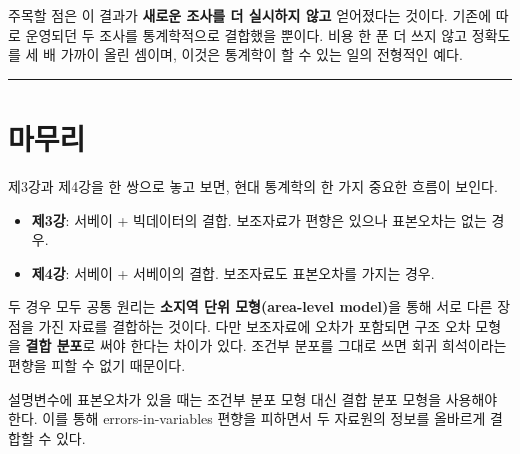 \documentclass[
  letterpaper,
  DIV=11,
  numbers=noendperiod]{scrreprt}
\providecommand{\tightlist}{%
  \setlength{\itemsep}{0pt}\setlength{\parskip}{0pt}}
\begin{document}
주목할 점은 이 결과가 \textbf{새로운 조사를 더 실시하지 않고} 얻어졌다는
것이다. 기존에 따로 운영되던 두 조사를 통계학적으로 결합했을 뿐이다.
비용 한 푼 더 쓰지 않고 정확도를 세 배 가까이 올린 셈이며, 이것은
통계학이 할 수 있는 일의 전형적인 예다.

\begin{center}\rule{0.5\linewidth}{0.5pt}\end{center}

\section{마무리}\label{uxb9c8uxbb34uxb9ac-2}

제3강과 제4강을 한 쌍으로 놓고 보면, 현대 통계학의 한 가지 중요한 흐름이
보인다.

\begin{itemize}
\tightlist
\item
  \textbf{제3강}: 서베이 + 빅데이터의 결합. 보조자료가 편향은 있으나
  표본오차는 없는 경우.
\item
  \textbf{제4강}: 서베이 + 서베이의 결합. 보조자료도 표본오차를 가지는
  경우.
\end{itemize}

두 경우 모두 공통 원리는 \textbf{소지역 단위 모형(area-level model)}을
통해 서로 다른 장점을 가진 자료를 결합하는 것이다. 다만 보조자료에
오차가 포함되면 구조 오차 모형을 \textbf{결합 분포}로 써야 한다는 차이가
있다. 조건부 분포를 그대로 쓰면 회귀 희석이라는 편향을 피할 수 없기
때문이다.

\begin{tcolorbox}[enhanced jigsaw, arc=.35mm, bottomrule=.15mm, bottomtitle=1mm, breakable, colback=white, colbacktitle=quarto-callout-important-color!10!white, colframe=quarto-callout-important-color-frame, coltitle=black, left=2mm, leftrule=.75mm, opacityback=0, opacitybacktitle=0.6, rightrule=.15mm, title=\textcolor{quarto-callout-important-color}{\faExclamation}\hspace{0.5em}{결론}, titlerule=0mm, toprule=.15mm, toptitle=1mm]

설명변수에 표본오차가 있을 때는 조건부 분포 모형 대신 결합 분포 모형을
사용해야 한다. 이를 통해 errors-in-variables 편향을 피하면서 두 자료원의
정보를 올바르게 결합할 수 있다.

\end{tcolorbox}
\end{document}
